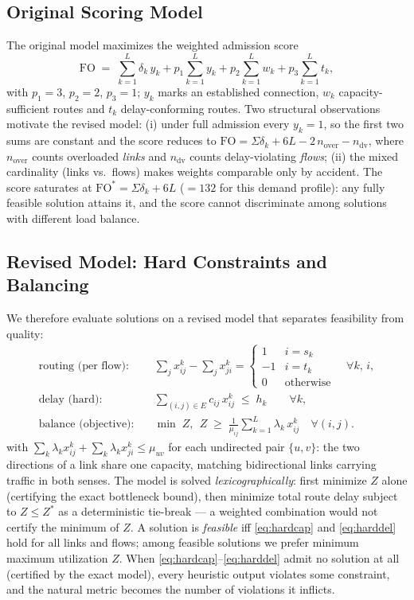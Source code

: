 \documentclass[journal]{IEEEtran}
\newcommand{\FO}{\mathrm{FO}}
\begin{document}
\subsection{Original Scoring Model}
\label{sec:origfo}
The original model maximizes the weighted admission score
\begin{equation}
\FO \;=\; \sum_{k=1}^{L}\delta_k\,y_k
   + p_1\sum_{k=1}^{L} y_k
   + p_2\sum_{k=1}^{L} w_k
   + p_3\sum_{k=1}^{L} t_k,
\label{eq:fo}
\end{equation}
with $p_1{=}3$, $p_2{=}2$, $p_3{=}1$; $y_k$ marks an established connection,
$w_k$ capacity-sufficient routes and $t_k$ delay-conforming routes. Two
structural observations motivate the revised model: (i) under full admission
every $y_k=1$, so the first two sums are constant and the score reduces to
$\FO = \Sigma\delta_k + 6L - 2\,n_{\mathrm{over}} - n_{\mathrm{dv}}$, where
$n_{\mathrm{over}}$ counts overloaded \emph{links} and $n_{\mathrm{dv}}$
counts delay-violating \emph{flows}; (ii) the mixed cardinality (links vs.\
flows) makes weights comparable only by accident. The score saturates at
$\FO^{*}=\Sigma\delta_k+6L$ ($=132$ for this demand profile): any fully feasible solution attains it, and the
score cannot discriminate among solutions with different load balance.

\subsection{Revised Model: Hard Constraints and Balancing}
\label{sec:revfo}
We therefore evaluate solutions on a revised model that separates
feasibility from quality:
\begin{align}
\text{routing (per flow):}\quad
&\sum_{j} x_{ij}^{k}-\sum_{j} x_{ji}^{k} =
\begin{cases} 1 & i=s_k\\ -1 & i=t_k\\ 0 & \text{otherwise}\end{cases}
\quad \forall k,\, i, \label{eq:flowcons}\\
\text{delay (hard):}\quad
&\sum_{(i,j)\in E} c_{ij}\,x_{ij}^{k} \;\le\; h_k
\qquad \forall k, \label{eq:harddel}\\
\text{balance (objective):}\quad
&\min\; Z,\ \ Z \;\ge\;
\frac{1}{\mu_{ij}}\sum_{k=1}^{L}\lambda_k\,x_{ij}^{k}
\quad \forall (i,j). \label{eq:minmax}
\end{align}
with $\sum_k \lambda_k x_{ij}^k + \sum_k \lambda_k x_{ji}^k \le \mu_{uv}$
for each undirected pair $\{u,v\}$: the two directions of a link share one
capacity, matching bidirectional links carrying traffic in both senses.
The model is solved \emph{lexicographically}: first minimize $Z$ alone
(certifying the exact bottleneck bound), then minimize total route delay
subject to $Z \le Z^{*}$ as a deterministic tie-break --- a weighted
combination would not certify the minimum of $Z$.
A solution is \emph{feasible} iff \eqref{eq:hardcap} and \eqref{eq:harddel}
hold for all links and flows; among feasible solutions we prefer minimum
maximum utilization $Z$. When \eqref{eq:hardcap}--\eqref{eq:harddel} admit no
solution at all (certified by the exact model), every heuristic output
violates some constraint, and the natural metric becomes the number of
violations it inflicts.
\end{document}
